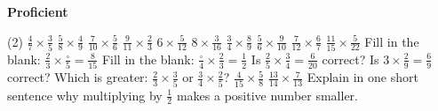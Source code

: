 \documentclass[17pt,a4paper,landscape]{extarticle}
\begin{document}
\sffamily
\boldmath

\boldmath

\vspace*{0.4em}
{\LARGE \textbf{Proficient}}
\begin{tasks}(2)
\task \mbox{$\frac{4}{7}\times\frac{3}{5}$}
\task \mbox{$\frac{5}{8}\times\frac{4}{9}$}
\task \mbox{$\frac{7}{10}\times\frac{5}{6}$}
\task \mbox{$\frac{9}{11}\times\frac{2}{3}$}
\task \mbox{$6\times\frac{5}{12}$}
\task \mbox{$8\times\frac{3}{16}$}
\task \mbox{$\frac{3}{4}\times\frac{8}{9}$}
\task \mbox{$\frac{5}{6}\times\frac{9}{10}$}
\task \mbox{$\frac{7}{12}\times\frac{6}{7}$}
\task \mbox{$\frac{11}{15}\times\frac{5}{22}$}
\task Fill in the blank: \mbox{$\frac{2}{3}\times\frac{\square}{5}=\frac{8}{15}$}
\task Fill in the blank: \mbox{$\frac{\square}{4}\times\frac{2}{3}=\frac{1}{2}$}
\task Is \mbox{$\frac{2}{5}\times\frac{3}{4}=\frac{6}{20}$} correct?
\task Is \mbox{$3\times\frac{2}{9}=\frac{6}{9}$} correct?
\task Which is greater: \mbox{$\frac{2}{3}\times\frac{3}{5}$} or \mbox{$\frac{3}{4}\times\frac{2}{5}$}?
\task \mbox{$\frac{4}{15}\times\frac{5}{8}$}
\task \mbox{$\frac{13}{14}\times\frac{7}{13}$}
\task Explain in one short sentence why multiplying by \mbox{$\frac{1}{2}$} makes a positive number smaller.
\end{tasks}
\end{document}
